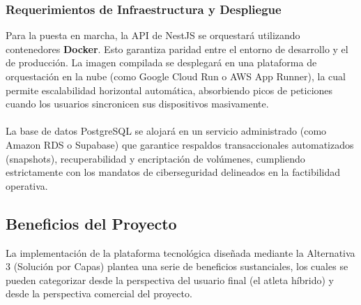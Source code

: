 \documentclass[12pt]{article}
\begin{document}
\subsubsection{Requerimientos de Infraestructura y Despliegue}
Para la puesta en marcha, la API de NestJS se orquestará utilizando contenedores \textbf{Docker}. Esto garantiza paridad entre el entorno de desarrollo y el de producción. La imagen compilada se desplegará en una plataforma de orquestación en la nube (como Google Cloud Run o AWS App Runner), la cual permite escalabilidad horizontal automática, absorbiendo picos de peticiones cuando los usuarios sincronicen sus dispositivos masivamente.
\\\\
La base de datos PostgreSQL se alojará en un servicio administrado (como Amazon RDS o Supabase) que garantice respaldos transaccionales automatizados (snapshots), recuperabilidad y encriptación de volúmenes, cumpliendo estrictamente con los mandatos de ciberseguridad delineados en la factibilidad operativa.
\newpage
\subsection{Beneficios del Proyecto}
La implementación de la plataforma tecnológica diseñada mediante la Alternativa 3 (Solución por Capas) plantea una serie de beneficios sustanciales, los cuales se pueden categorizar desde la perspectiva del usuario final (el atleta híbrido) y desde la perspectiva comercial del proyecto.
\end{document}
